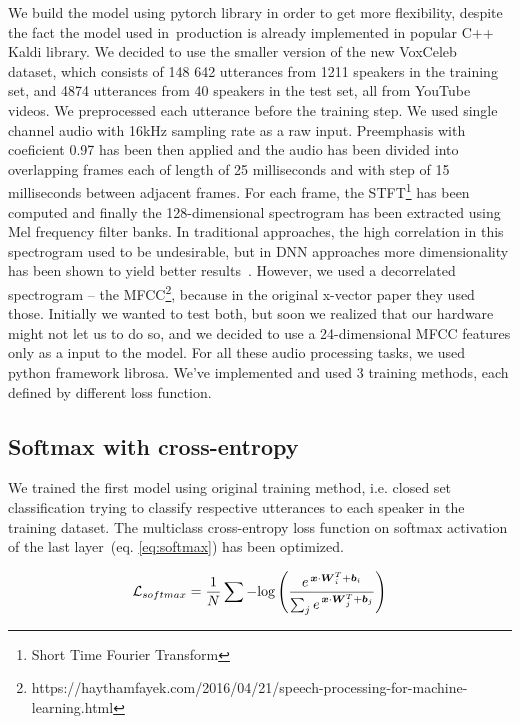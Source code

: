 We build the model using pytorch library in order to get more flexibility, despite the fact the model used in~production is already implemented in popular C++ Kaldi library. We decided to use the smaller version of the new VoxCeleb~\cite{VoxCeleb} dataset, which consists of 148 642 utterances from 1211 speakers in the training set, and 4874 utterances from 40 speakers in the test set, all from YouTube videos. We preprocessed each utterance before the training step. We used single channel audio with 16kHz sampling rate as a raw input. Preemphasis with coeficient 0.97 has been then applied and the audio has been divided into overlapping frames each of length of 25 milliseconds and with step of 15 milliseconds between adjacent frames. For each frame, the STFT\footnote{Short Time Fourier Transform} has been computed and finally the 128-dimensional spectrogram has been extracted using Mel frequency filter banks. In traditional approaches, the high correlation in this spectrogram used to be undesirable, but in DNN approaches more dimensionality has been shown to yield better results~\cite{CNN_2016}. However, we used a decorrelated spectrogram -- the MFCC\footnote{https://haythamfayek.com/2016/04/21/speech-processing-for-machine-learning.html}, because in the original x-vector paper they used those. Initially we wanted to test both, but soon we realized that our hardware might not let us to do so, and we decided to use a 24-dimensional MFCC features only as a input to the model. For all these audio processing tasks, we used python framework librosa. We've implemented and used 3 training methods, each defined by different loss function.

\subsection*{Softmax with cross-entropy} \label{simple_softmax_training}

We trained the first model using original training method, i.e. closed set classification trying to classify respective utterances to each speaker in the training dataset. The multiclass cross-entropy loss function on softmax activation of the last layer~(eq. \ref{eq:softmax}) has been optimized.

\begin{equation} \label{eq:softmax}
\mathcal{L}_{softmax} = \frac{1}{N} \sum - \textnormal{log} \left(
\frac{e^{\,\boldsymbol{x} \cdot \boldsymbol{W}_i^T + \boldsymbol{b}_i}}
{\sum_{j} e^{\,\boldsymbol{x} \cdot \boldsymbol{W}_j^T + \boldsymbol{b}_j}}
\right)
\end{equation}

